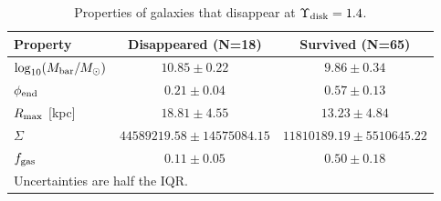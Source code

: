 \begin{table}[htbp]
\centering
\caption{Properties of galaxies that disappear at $\Upsilon_{\rm disk}=1.4$.}
\label{tab:disappearing}
\begin{tabular}{lcc}
\hline
Property & Disappeared (N=18) & Survived (N=65) \\
\hline
$\log_{10}(M_{\rm bar}/M_\odot)$ & $10.85 \pm 0.22$ & $9.86 \pm 0.34$ \\
$\phi_{\rm end}$ & $0.21 \pm 0.04$ & $0.57 \pm 0.13$ \\
$R_{\rm max}$ [kpc] & $18.81 \pm 4.55$ & $13.23 \pm 4.84$ \\
$\Sigma$ & $44589219.58 \pm 14575084.15$ & $11810189.19 \pm 5510645.22$ \\
$f_{\rm gas}$ & $0.11 \pm 0.05$ & $0.50 \pm 0.18$ \\
\hline
\multicolumn{3}{l}{\footnotesize Uncertainties are half the IQR.} \\
\end{tabular}
\end{table}
